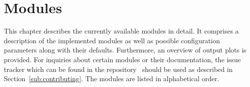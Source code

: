 \chapter{Modules}
\label{ch:modules}

This chapter describes the currently available \corry modules in detail.
It comprises a description of the implemented modules as well as possible configuration parameters along with their defaults.
Furthermore, an overview of output plots is provided.
For inquiries about certain modules or their documentation, the \corry issue tracker which can be found in the repository~\cite{corry-issue-tracker} should be used as described in Section~\ref{sub:contributing}.
The modules are listed in alphabetical order.
